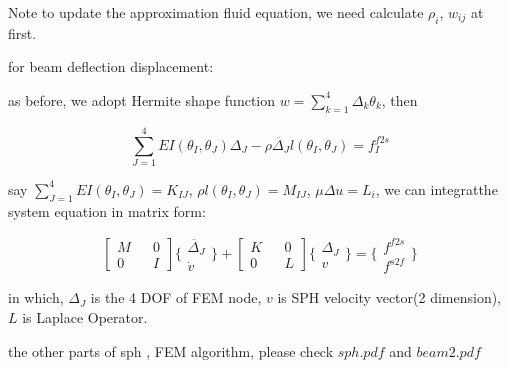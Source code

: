 \documentclass[11pt]{article}
\begin{document}
Note to update the approximation fluid equation, we need calculate $\rho_i$, $w_{ij}$ at first.


for beam deflection displacement:

as before, we adopt Hermite shape function $ w = \sum_{k=1}^4 \Delta_k \theta_k $, then

$$ \sum_{J=1}^4 EI(\theta_I, \theta_J) \Delta_J - \rho \ddot{\Delta_J} l(\theta_I, \theta_J) = f_I^{f2s} $$


say $ \sum_{J=1}^4 EI(\theta_I,\theta_J) = K_{IJ}$, $ \rho l(\theta_I, \theta_J) = M_{IJ} $, $\mu \Delta u = L_i$, we can integratthe system equation in matrix form:


 $$ \begin{bmatrix} M && 0 \\ 0 && I \end{bmatrix} \{ \begin{array}{c} \ddot{\Delta_J} \\ \dot{v} \end{array} \} + \begin{bmatrix} K && 0 \\ 0 && L \end{bmatrix} \{ \begin{array}{c} \Delta_J \\ v \end{array} \} = \{ \begin{array}{c} f^{f2s}\\ f^{s2f} \end{array} \} $$

in which, $\Delta_J$ is the 4 DOF of FEM node, $v$ is SPH velocity vector(2 dimension), $L$ is Laplace Operator.

the other parts of sph , FEM algorithm, please check $sph.pdf$ and $beam2.pdf$
\end{document}
